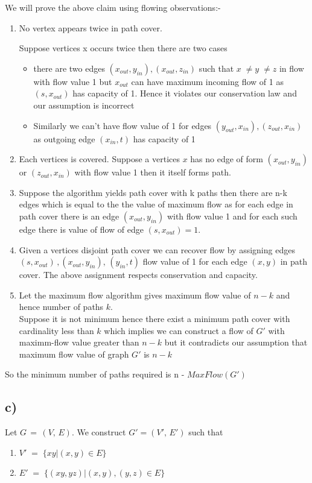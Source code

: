 \documentclass{report}
\begin{document}
 We will prove the above claim using flowing observations:-
 \begin{enumerate}
     \item  No vertex appears twice in path cover.
     
       Suppose vertices x occurs twice then there are two cases
       \begin{itemize}
           \item there are two edges $(x_{out}, y_{in}), (x_{out}, z_{in}) $ such that $x\;\neq y\;\neq z$ in flow with flow value 1 but $x_{out}$ can have maximum incoming flow of 1 as $(s,x_{out})$ has capacity of 1. Hence it violates our conservation law and our assumption is incorrect
           \item Similarly we can't have flow value of 1 for edges $(y_{out},x_{in}),(z_{out},x_{in})$ as outgoing edge $(x_{in}, t)$ has capacity of 1
         \end{itemize} 
         
    \item
    Each vertices is covered. Suppose a vertices $x$ has no  edge of form $(x_{out},y_{in})$ or $(z_{out},x_{in})$ with flow value 1 then it itself forms path.  
    \item
    Suppose the algorithm yields path cover with k paths then there are n-k edges which is equal to the the value of maximum flow as for each edge in path cover there is an edge $(x_{out}, y_{in})$ with flow value 1 and for each such edge there is value of flow of edge $(s, x_{out}) = 1$.
    \item
    Given a vertices disjoint path cover we can recover flow by assigning edges $(s,x_{out})\,, (x_{out}, y_{in}),\,(y_{in},t)$ flow value of 1 for each edge $(x,y)$ in path cover. The above assignment respects conservation and capacity.
    \item
    Let the maximum flow algorithm gives maximum flow value of $n-k$ and hence number of paths $k$.\\
    Suppose it is not minimum hence there exist a minimum path cover with cardinality less than $k$ which implies we can construct a flow of $G'$ with maximm-flow value greater than $n-k$ but it contradicts our assumption that maximum flow value of graph $G'$ is $n-k$
       
      
 \end{enumerate}
 So the minimum number of paths required is n - $MaxFlow(G')$ 
 \subsection*{c)}
 Let $G \,=\, (V, \, E)$. We construct $G' = (V', \, E')$ such that\\
 \begin{enumerate}
     \item
     $V'\; = \; \{xy | (x,y)\in E\}$
     \item
     $E' \; = \; \{(xy,yz) | (x,y) , (y, z)\in E\}$
     
 \end{enumerate}
 
\end{document}
